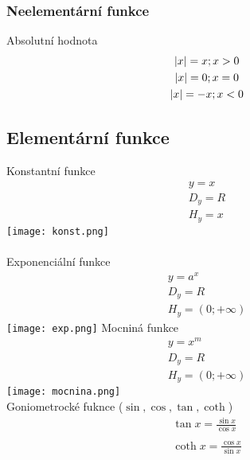 \subsubsection*{Neelementární funkce}
Absolutní hodnota
\begin{gather*}    
    \lvert x\rvert = x ; x > 0 \\
    \lvert x\rvert = 0 ; x = 0 \\
    \lvert x\rvert = -x ; x < 0
\end{gather*}
\subsection*{Elementární funkce}
Konstantní funkce
\begin{gather*}
    y = x \\
    D_y = R \\
    H_y = {x}
\end{gather*}
\texttt{[image: konst.png]}
\\\\
Exponenciální funkce
\begin{gather*}
    y = a^x \\
    D_y = R \\
    H_y = (0;+\infty)
\end{gather*}
\texttt{[image: exp.png]} 
\page
Mocniná funkce
\begin{gather*}
    y = x^m \\
    D_y = R \\
    H_y = (0;+\infty)
\end{gather*}
\texttt{[image: mocnina.png]} \\
Goniometrocké fuknce
($\sin{},\cos{},\tan{}, \coth{}$)
\begin{gather*}
    \tan{x}=\frac{\sin{x}}{\cos{x}} \\ \\
    \coth{x}=\frac{\cos{x}}{\sin{x}}
\end{gather*}
